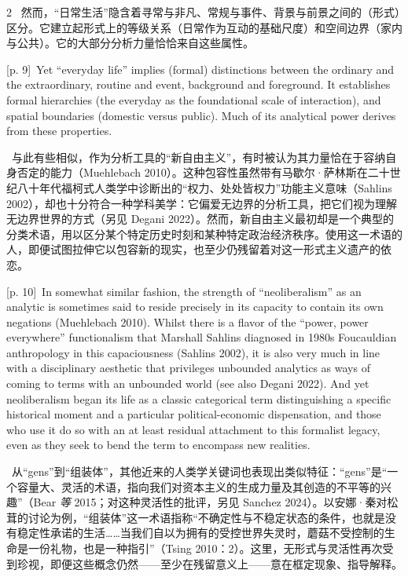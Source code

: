 \documentclass[10pt,a4paper]{article}
\begin{document}
\begin{paracol}{2}
\switchcolumn*
{\scriptsize\color{gray} [p. 9]}\ 然而，“日常生活”隐含着寻常与非凡、常规与事件、背景与前景之间的（形式）区分。它建立起形式上的等级关系（日常作为互动的基础尺度）和空间边界（家内与公共）。它的大部分分析力量恰恰来自这些属性。\par
\switchcolumn
{\scriptsize\color{gray} [p. 9]}\ Yet “everyday life” implies (formal) distinctions between the ordinary and the extraordinary, routine and event, background and foreground. It establishes formal hierarchies (the everyday as the foundational scale of interaction), and spatial boundaries (domestic versus public). Much of its analytical power derives from these properties.\par
\switchcolumn*
{\scriptsize\color{gray} [p. 10]}\ 与此有些相似，作为分析工具的“新自由主义”，有时被认为其力量恰在于容纳自身否定的能力（Muehlebach 2010）。这种包容性虽然带有马歇尔·萨林斯在二十世纪八十年代福柯式人类学中诊断出的“权力、处处皆权力”功能主义意味（Sahlins 2002），却也十分符合一种学科美学：它偏爱无边界的分析工具，把它们视为理解无边界世界的方式（另见 Degani 2022）。然而，新自由主义最初却是一个典型的分类术语，用以区分某个特定历史时刻和某种特定政治经济秩序。使用这一术语的人，即便试图拉伸它以包容新的现实，也至少仍残留着对这一形式主义遗产的依恋。\par
\switchcolumn
{\scriptsize\color{gray} [p. 10]}\ In somewhat similar fashion, the strength of “neoliberalism” as an analytic is sometimes said to reside precisely in its capacity to contain its own negations (Muehlebach 2010). Whilst there is a flavor of the “power, power everywhere” functionalism that Marshall Sahlins diagnosed in 1980s Foucauldian anthropology in this capaciousness (Sahlins 2002), it is also very much in line with a disciplinary aesthetic that privileges unbounded analytics as ways of coming to terms with an unbounded world (see also Degani 2022). And yet neoliberalism began its life as a classic categorical term distinguishing a specific historical moment and a particular political-economic dispensation, and those who use it do so with an at least residual attachment to this formalist legacy, even as they seek to bend the term to encompass new realities.\par
\switchcolumn*
{\scriptsize\color{gray} [p. 10]}\ 从“gens”到“组装体”，其他近来的人类学关键词也表现出类似特征：“gens”是“一个容量大、灵活的术语，指向我们对资本主义的生成力量及其创造的不平等的兴趣”（Bear \textit{等} 2015；对这种灵活性的批评，另见 Sanchez 2024）。以安娜·秦对松茸的讨论为例，“组装体”这一术语指称“不确定性与不稳定状态的条件，也就是没有稳定性承诺的生活……当我们自以为拥有的受控世界失灵时，蘑菇不受控制的生命是一份礼物，也是一种指引”（Tsing 2010：2）。这里，无形式与灵活性再次受到珍视，即便这些概念仍然——至少在残留意义上——意在框定现象、指导解释。\par

\end{paracol}
\end{document}
